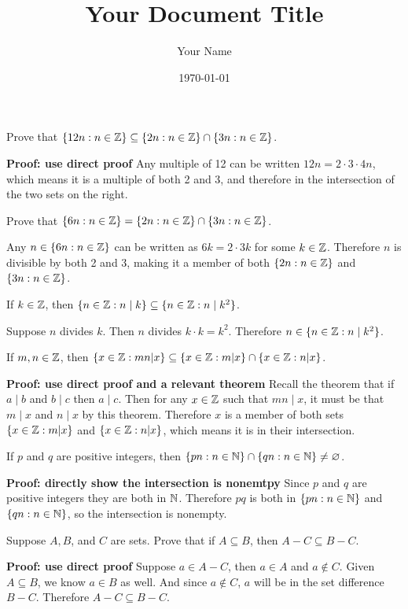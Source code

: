 \documentclass{article}
\title{Your Document Title}
\author{Your Name}
\date{\today} %
\begin{document}
\maketitle


\begin{problem}
Prove that \(\{12n : n \in \mathbb{Z}\} \subseteq \{2n : n \in \mathbb{Z}\} \cap \{3n : n \in \mathbb{Z}\}\).
\end{problem}

\textbf{Proof: use direct proof}
Any multiple of 12 can be written \(12n = 2\cdot3\cdot4 n\), which means it is a multiple of both 2 and 3, and therefore in the intersection of the two sets on the right.

\begin{problem}
Prove that \(\{6n: n \in \mathbb{Z}\} = \{2n : n \in \mathbb{Z}\} \cap \{3n : n \in \mathbb{Z}\}\).
\end{problem}
Any \(n \in \{6n: n \in \mathbb{Z}\}\) can be written as \(6k = 2\cdot 3k\) for some \(k \in \mathbb{Z}\). Therefore \(n\) is divisible by both 2 and 3, making it a member of both \(\{2n : n \in \mathbb{Z}\}\) and \(\{3n : n \in \mathbb{Z}\}\).

\begin{problem}
If \(k \in \mathbb{Z}\), then $\{n \in \mathbb{Z}: n \mid k\} \subseteq \{n \in \mathbb{Z}: n \mid k^2\}$.
\end{problem}
Suppose $n$ divides $k$. Then $n$ divides $k\cdot k = k^2$. Therefore $n \in \{n\in \mathbb{Z}: n \mid k^2\}$.

\begin{problem}
If $m, n \in \mathbb{Z}$, then $\{x \in \mathbb{Z}: mn | x\} \subseteq \{x \in \mathbb{Z}: m | x\} \cap \{x \in \mathbb{Z}: n | x\}$.
\end{problem}
\textbf{Proof: use direct proof and a relevant theorem}
Recall the theorem that if $a \mid b$ and $b \mid c$ then $a \mid c$. Then for any $x \in \mathbb{Z}$ such that $mn \mid x$, it must be that $m \mid x$ and $n \mid x$ by this theorem. Therefore $x$ is a member of both sets $\{x \in \mathbb{Z}: m | x\}$ and $\{x \in \mathbb{Z}: n | x\}$, which means it is in their intersection.

\begin{problem}
If $p$ and $q$ are positive integers, then $\{pn : n \in \mathbb{N}\} \cap \{qn : n \in \mathbb{N}\} \neq \varnothing$.
\end{problem}
\textbf{Proof: directly show the intersection is nonemtpy}
Since $p$ and $q$ are positive integers they are both in $\mathbb{N}$. Therefore $pq$ is both in $\{pn : n \in \mathbb{N}\}$ and $\{qn : n \in \mathbb{N}\}$, so the intersection is nonempty.

\begin{problem}
Suppose $A, B$, and $C$ are sets. Prove that if $A \subseteq B$, then $A - C \subseteq B - C$.
\end{problem}
\textbf{Proof: use direct proof}
Suppose $a \in A - C$, then $a \in A$ and $a \not\in C$. Given $A \subseteq B$, we know $a \in B$ as well. And since $a \not\in C$, $a$ will be in the set difference $B - C$. Therefore $A - C \subseteq B - C$.
\end{document}

